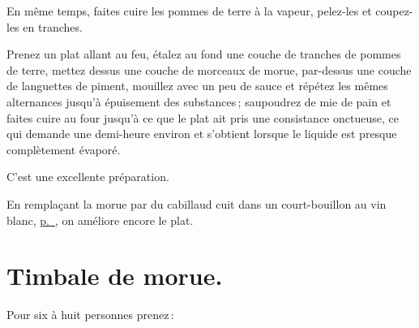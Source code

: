 En même temps, faites cuire les pommes de terre à la vapeur, pelez-les et
coupez-les en tranches.

Prenez un plat allant au feu, étalez au fond une couche de tranches de pommes
de terre, mettez dessus une couche de morceaux de morue, par-dessus une couche
de languettes de piment, mouillez avec un peu de sauce et répétez les mêmes
alternances jusqu'à épuisement des substances ; saupoudrez de mie de pain et
faites cuire au four jusqu'à ce que le plat ait pris une consistance onctueuse,
ce qui demande une demi-heure environ et s'obtient lorsque le liquide est
presque complètement évaporé.

C'est une excellente préparation.

\sk

En remplaçant la morue par du cabillaud cuit dans un court-bouillon au vin
blanc, \hyperlink{p0324}{p. \pageref{pg0324}}, on améliore encore le plat.

\section*{\centering Timbale de morue.}

Pour six à huit personnes prenez :

\medskip

